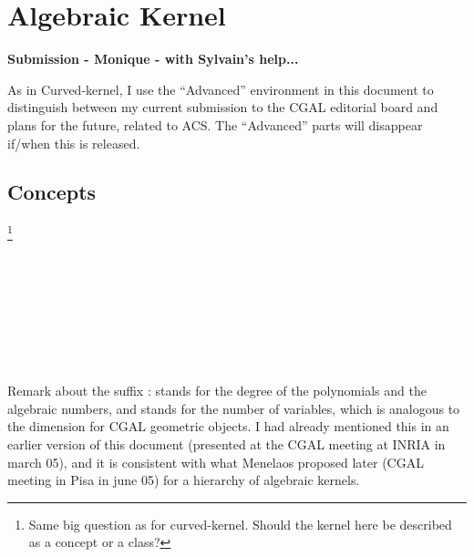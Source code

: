 \chapter{Algebraic Kernel}

\textbf{Submission - Monique - with Sylvain's help...}

\begin{ccAdvanced}
As in Curved-kernel, I use the ``Advanced'' environment in this
document to distinguish between my current submission to the CGAL
editorial board and plans for the future, related to ACS. The
``Advanced'' parts will disappear if/when this is released.
\end{ccAdvanced}

\section*{Concepts}

\footnote{Same big question as for curved-kernel. Should the kernel here
be described as a concept or a class?}

\\
\\
\\
\\

\begin{ccAdvanced}
\\
\\
\end{ccAdvanced}

\begin{ccAdvanced}
Remark about the suffix :  stands 
for the degree of the polynomials and the algebraic numbers, and
 stands for the number of variables, which is analogous to the
dimension for CGAL geometric objects. I had already mentioned this in an
earlier version of this document (presented at the CGAL meeting at
INRIA in march 05), and it is consistent with what Menelaos proposed
later (CGAL meeting in Pisa in june 05) for a hierarchy of algebraic kernels.
\end{ccAdvanced}

